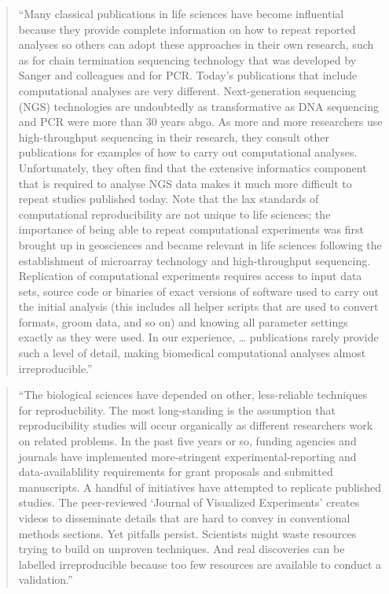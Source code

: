 \documentclass[]{tufte-book}
\begin{document}
\begin{quote}
``Many classical publications in life sciences have become influential because they
provide complete information on how to repeat reported analyses so others can adopt
these approaches in their own research, such as for chain termination sequencing
technology that was developed by Sanger and colleagues and for PCR. Today's publications
that include computational analyses are very different. Next-generation sequencing (NGS)
technologies are undoubtedly as transformative as DNA sequencing and PCR were more than
30 years abgo. As more and more researchers use high-throughput sequencing in their
research, they consult other publications for examples of how to carry out computational
analyses. Unfortunately, they often find that the extensive informatics component that
is required to analyse NGS data makes it much more difficult to repeat studies published
today. Note that the lax standards of computational reproducibility are not unique to
life sciences; the importance of being able to repeat computational experiments was
first brought up in geosciences and became relevant in life sciences following the
establishment of microarray technology and high-throughput sequencing. Replication
of computational experiments requires access to input data sets, source code or binaries
of exact versions of software used to carry out the initial analysis (this includes
all helper scripts that are used to convert formats, groom data, and so on) and
knowing all parameter settings exactly as they were used. In our experience, \ldots{}
publications rarely provide such a level of detail, making biomedical computational
analyses almost irreproducible.'' \citep{nekrutenko2012next}
\end{quote}

\begin{quote}
``The biological sciences have depended on other, less-reliable techniques
for reproducbility. The most long-standing is the assumption that reproducibility
studies will occur organically as different researchers work on related problems.
In the past five years or so, funding agencies and journals have implemented
more-stringent experimental-reporting and data-availablility requirements for
grant proposals and submitted manuscripts. A handful of initiatives have attempted
to replicate published studies. The peer-reviewed `Journal of Visualized Experiments'
creates videos to disseminate details that are hard to convey in conventional
methods sections. Yet pitfalls persist. Scientists might waste resources trying
to build on unproven techniques. And real discoveries can be labelled irreproducible
because too few resources are available to conduct a validation.'' \citep{raphael2020controlled}
\end{quote}
\end{document}
